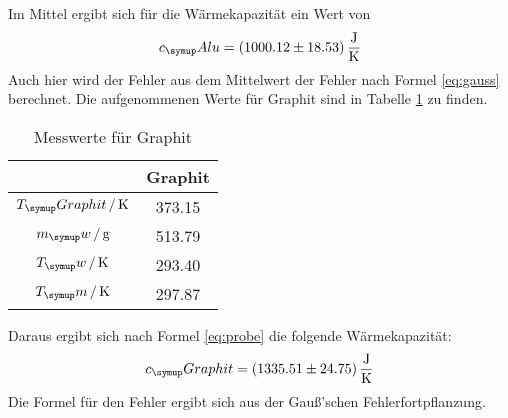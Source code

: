 Im Mittel ergibt sich für die Wärmekapazität ein Wert von
\begin{equation*}
  c_\su{Alu}=(1000.12\pm18.53)\,\si{\joule\per\kelvin}
\end{equation*}
Auch hier wird der Fehler aus dem Mittelwert der Fehler nach Formel \eqref{eq:gauss}
berechnet.
Die aufgenommenen Werte für Graphit sind in Tabelle \ref{tab:alug}
zu finden.
\begin{table}
  \centering
  \begin{tabular}{c c}
    \toprule
    \hrulefill & Graphit \\
    \midrule
    $T_\su{Graphit}\,/\Kel$& 373.15 \\
    $m_\su{w}\,/\gr$  & 513.79 \\
    $T_\su{w}\,/\Kel$ & 293.40 \\
    $T_\su{m}\,/\Kel$    & 297.87 \\
    \bottomrule
  \end{tabular}
  \caption{Messwerte für Graphit}
  \label{tab:alug}
\end{table}
Daraus ergibt sich nach Formel \eqref{eq:probe} die folgende Wärmekapazität:
\begin{equation}
  c_\su{Graphit}= (1335.51\pm24.75)\,\si{\joule\per\kelvin}
\end{equation}
Die Formel für den Fehler ergibt sich
aus der Gauß'schen Fehlerfortpflanzung.
